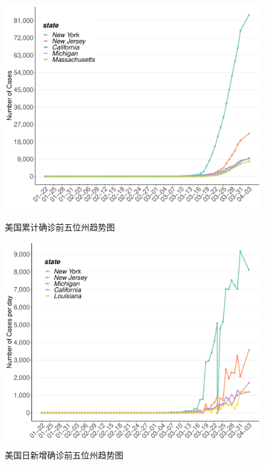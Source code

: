 \documentclass[]{article}
\begin{document}
\begin{figure}[H]
\centering
\begin{minipage}[b]{0.45\linewidth}
\includegraphics[]{./input/table_plot/covid6.pdf}
\caption{美国累计确诊前五位州趋势图}
\label{}
\end{minipage}
\quad
\begin{minipage}[b]{0.45\linewidth}
\includegraphics[]{./input/table_plot/covid7.pdf}
\caption{美国⽇新增确诊前五位州趋势图}
\label{}
\end{minipage}
\end{figure}
\end{document}
